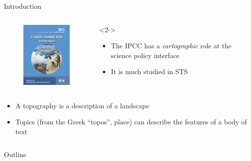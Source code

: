 \documentclass[9pt, aspectratio=169]{beamer}
\begin{document}
\begin{frame}{Introduction}
\begin{columns}[T]
\begin{column}{0.6\linewidth}
\begin{columns}[t]
\begin{column}{0.45\linewidth}
					\begin{figure}
						\includegraphics[width=0.6\linewidth]{syrcover}
					\end{figure}
				\end{column}
				\begin{column}{0.45\linewidth}<2->
					\begin{itemize}
						\item<2-> The IPCC has a \textit{cartographic} role at the science policy interface \citep{Edenhofer2014, Edenhofer2015}
						\item<3-> It is much studied in STS \citep{Hulme2010}
					\end{itemize}
				\end{column}
			\end{columns}
		\bigskip
		\begin{center}
			\begin{itemize}
				\item<4-> A topography is a description of a landscape
				\item<5-> Topics (from the Greek ``topos'', place) can describe the features of a body of text
			\end{itemize}
		\end{center}
	\end{column}
\end{columns}
\end{frame}

\begin{frame}{Outline}
\tableofcontents
\end{frame}
\end{document}
